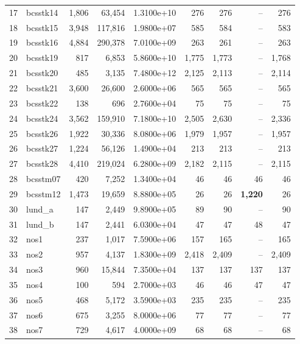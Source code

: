 \begin{table}
\begin{center}
\begin{tabular}{rlrrr||rrrr}
 \\
 17 &   bcsstk14 & 1,806 &    63,454 & 1.3100e+10 & 276 &  276 &  -- &  276 \\
 18 &   bcsstk15 & 3,948 &   117,816 & 1.9800e+07 & 585 &  584 &  -- &  583 \\
 19 &   bcsstk16 & 4,884 &   290,378 & 7.0100e+09 & 263 &  261 &  -- &  263 \\
 20 &   bcsstk19 &  817 &     6,853 & 5.8600e+10 &1,775 & 1,773 &  -- & 1,768 \\
 21 &   bcsstk20 &  485 &     3,135 & 7.4800e+12 &2,125 & 2,113 &  -- & 2,114 \\
 22 &   bcsstk21 & 3,600 &    26,600 & 2.6000e+06 & 565 &  565 &  -- &  565 \\
 23 &   bcsstk22 &  138 &      696 & 2.7600e+04 &  75 &   75 &  -- &   75 \\
 24 &   bcsstk24 & 3,562 &   159,910 & 7.1800e+10 &2,505 & 2,630 &  -- & 2,336 
 \\
 25 &   bcsstk26 & 1,922 &    30,336 & 8.0800e+06 &1,979 & 1,957 &  -- & 1,957 
 \\
 26 &   bcsstk27 & 1,224 &    56,126 & 1.4900e+04 & 213 &  213 &  -- &  213 \\
 27 &   bcsstk28 & 4,410 &   219,024 & 6.2800e+09 &2,182 & 2,115 &  -- & 2,115 
 \\
 28 &   bcsstm07 &  420 &     7,252 & 1.3400e+04 &  46 &   46 &   46 &   46 \\
 29 &   bcsstm12 & 1,473 &    19,659 & 8.8800e+05 &  26 &   26 & \textbf{1,220} 
 &   26 \\
 30 &    lund\_a &  147 &     2,449 & 9.8900e+05 &  89 &   90 &  -- &   90 \\
 31 &    lund\_b &  147 &     2,441 & 6.0300e+04 &  47 &   47 &   48 &   47 \\
 32 &       nos1 &  237 &     1,017 & 7.5900e+06 & 157 &  165 &  -- &  165 \\
 33 &       nos2 &  957 &     4,137 & 1.8300e+09 &2,418 & 2,409 &  -- & 2,409 \\
 34 &       nos3 &  960 &    15,844 & 7.3500e+04 & 137 &  137 &  137 &  137 \\
 35 &       nos4 &  100 &      594 & 2.7000e+03 &  46 &   46 &   47 &   47 \\
 36 &       nos5 &  468 &     5,172 & 3.5900e+03 & 235 &  235 &  -- &  235 \\
 37 &       nos6 &  675 &     3,255 & 8.0000e+06 &  77 &   77 &  -- &   77 \\
 38 &       nos7 &  729 &     4,617 & 4.0000e+09 &  68 &   68 &  -- &   68 \\

\end{tabular}
\end{center}
\end{table}
